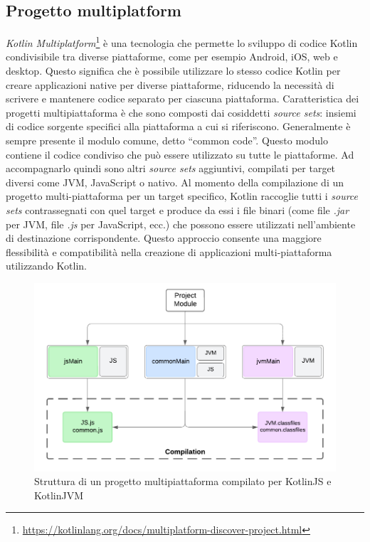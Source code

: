 \subsection{Progetto multiplatform}
\textit{Kotlin Multiplatform}\footnote{\url{https://kotlinlang.org/docs/multiplatform-discover-project.html}} è una tecnologia che permette lo sviluppo di codice Kotlin condivisibile tra diverse piattaforme, come per esempio Android, iOS, web e desktop. Questo significa che è possibile utilizzare lo stesso codice Kotlin per creare applicazioni native per diverse piattaforme, riducendo la necessità di scrivere e mantenere codice separato per ciascuna piattaforma.
Caratteristica dei progetti multipiattaforma è che sono composti dai cosiddetti \textit{source sets}: insiemi di codice sorgente specifici alla piattaforma a cui si riferiscono. Generalmente è sempre presente il modulo comune, detto ``common code''. Questo modulo contiene il codice condiviso che può essere utilizzato su tutte le piattaforme. Ad accompagnarlo quindi sono altri \textit{source sets} aggiuntivi, compilati per target diversi come \ac{JVM}, JavaScript o nativo.  
Al momento della compilazione di un progetto multi-piattaforma per un target specifico, Kotlin raccoglie tutti i \textit{source sets} contrassegnati con quel target e produce da essi i file binari (come file \textit{.jar} per JVM, file \textit{.js} per JavaScript, ecc.) che possono essere utilizzati nell'ambiente di destinazione corrispondente.
Questo approccio consente una maggiore flessibilità e compatibilità nella creazione di applicazioni multi-piattaforma utilizzando Kotlin.
\begin{figure}
	\centering
	\includegraphics[width=.7\linewidth]{imgs/MPProject.pdf}
	\caption{Struttura di un progetto multipiattaforma compilato per KotlinJS e KotlinJVM}
	\label{fig:mpp-project}
\end{figure}

